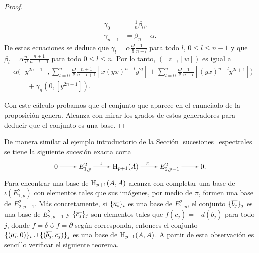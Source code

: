 \documentclass[fleqn,../tesis.tex]{subfiles}
\begin{document}
\begin{proof}
\begin{itemize}
\begin{align*}
        \gamma_0 &= \frac{1}{n}\beta_0,\\
        \gamma_{n - 1} &= \beta_n - \alpha.     
    \end{align*}
    De estas ecuaciones se deduce que $\gamma_l = \alpha \frac{n!}{l!} \frac{1}{n - l}$ para todo $l$, $0 \leq l \leq n - 1$ y
    que $\beta_l  = \alpha \frac{n!}{l!} \frac{n + 1}{n - l + 1}$ para todo $0 \leq l \leq n$. Por lo tanto, $([z], [w])$ es igual a
    \begin{align*}
     &\alpha \Bigg(\left[y^{2n + 1}\right],
            \sum_{l = 0}^{n}\frac{n!}{l!} \frac{n + 1}{n - l + 1}\left[x(yx)^{n -l}y^{2l}\right]
                + \sum_{l = 0}^{n}\frac{n!}{l!}\frac{1}{n - l}\left[(yx)^{n - l}y^{2l + 1}\right]\Bigg)\\
      &\qquad + \gamma_n \left(0, \left[y^{2n + 1}\right]\right).
    \end{align*}
    \end{itemize}
    Con este cálculo probamos que el conjunto que aparece en el enunciado de la proposición genera. Alcanza
    con mirar los grados de estos generadores para deducir que el conjunto es una base.
\end{proof}

De manera similar al ejemplo introductorio de la Sección \ref{sucesiones_espectrales} se tiene la siguiente sucesión
exacta corta
\begin{align*}
\xymatrix{
    0 \ar[r] & E_{1, p}^{2} \ar[r]^(.4){\iota} & \Hy_{p + 1}(A) \ar[r]^{\pi} & E_{2, p - 1}^{2} \ar[r] & 0.
}
\end{align*}
Para encontrar una
base de $\operatorname{H}_{p + 1}(A, A)$ alcanza con completar una base de $\iota\left(E_{1, p}^{2}\right)$ con elementos
tales que sus imágenes, por medio de $\pi$, formen una base de $E_{2, p - 1}^{2}$. Más concretamente, si $\{\overline{a_i}\}_i$
es una base de $E_{1, p}^{2}$, el conjunto $\{\overline{b_j}\}_j$ es una base de $E_{2, p - 1}^{2}$ y $\{\overline{c_j}\}_j$ son
elementos tales que $f(c_j) = -d(b_j)$ para todo $j$, donde $f = \delta$ ó $f = \partial$ según corresponda, entonces 
el conjunto $\{(\overline{a_i}, 0)\}_i \cup \{(\overline{b_j}, \overline{c_j})\}_j$ es una base de $\operatorname{H}_{p + 1}(A, A)$. A partir
de esta observación es sencillo verificar el siguiente teorema.
\end{document}
